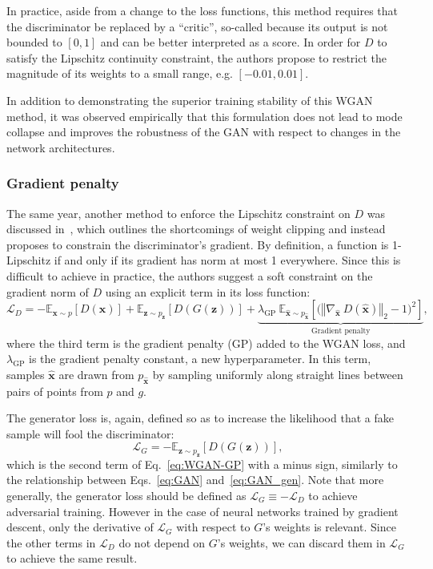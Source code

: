 In practice, aside from a change to the loss functions, this method requires
that the discriminator be replaced by a ``critic'', so-called because its output
is not bounded to $[0, 1]$ and can be better interpreted as a score. In order
for $D$ to satisfy the Lipschitz continuity constraint, the authors propose to
restrict the magnitude of its weights to a small range, e.g. $[-0.01, 0.01]$.

In addition to demonstrating the superior training stability of this WGAN
method, it was observed empirically that this formulation does not lead to mode
collapse and improves the robustness of the GAN with respect to changes in the
network architectures.

\subsubsection{Gradient penalty}
The same year, another method to enforce the Lipschitz constraint on $D$ was
discussed in~\cite{NIPS2017_892c3b1c}, which outlines the shortcomings of weight
clipping and instead proposes to constrain the discriminator's gradient. By
definition, a function is 1-Lipschitz if and only if its gradient has norm at
most 1 everywhere. Since this is difficult to achieve in practice, the authors
suggest a soft constraint on the gradient norm of $D$ using an explicit term in
its loss function:
\begin{equation}\label{eq:WGAN-GP}
    \mathcal{L}_D =
    -\mathbb{E}_{\bm{x} \sim p} \left[ D(\bm{x}) \right] +
    \mathbb{E}_{\bm{z} \sim p_{\bm{z}}} \left[ D(G(\bm{z})) \right] +
    \underbrace{\lambda_\mathrm{GP}\ \mathbb{E}_{\hat{\bm{x}} \sim p_{\hat{\bm{x}}}}
    \left[ \big( \left\Vert \nabla_{\hat{\bm{x}}}\ D(\hat{\bm{x}}) \right\Vert_2 - 1 \big) ^2 \right]}_\textrm{Gradient penalty},
\end{equation}
where the third term is the gradient penalty (GP) added to the WGAN loss, and
$\lambda_\mathrm{GP}$ is the gradient penalty constant, a new hyperparameter. In
this term, samples $\hat{\bm{x}}$ are drawn from $p_{\hat{\bm{x}}}$ by
sampling uniformly along straight lines between pairs of points from $p$ and
$g$.

The generator loss is, again, defined so as to increase the likelihood that a
fake sample will fool the discriminator:
\begin{equation}\label{eq:WGAN-GP_gen}
    \mathcal{L}_G =
    -\mathbb{E}_{\bm{z} \sim p_{\bm{z}}} \left[ D(G(\bm{z})) \right],
\end{equation}
which is the second term of Eq.~\ref{eq:WGAN-GP} with a minus sign, similarly to
the relationship between Eqs.~\ref{eq:GAN} and~\ref{eq:GAN_gen}. Note that more
generally, the generator loss should be defined as $\mathcal{L}_G \equiv
-\mathcal{L}_D$ to achieve adversarial training. However in the case of neural
networks trained by gradient descent, only the derivative of $\mathcal{L}_G$
with respect to $G$'s weights is relevant. Since the other terms in
$\mathcal{L}_D$ do not depend on $G$'s weights, we can discard them in
$\mathcal{L}_G$ to achieve the same result.

